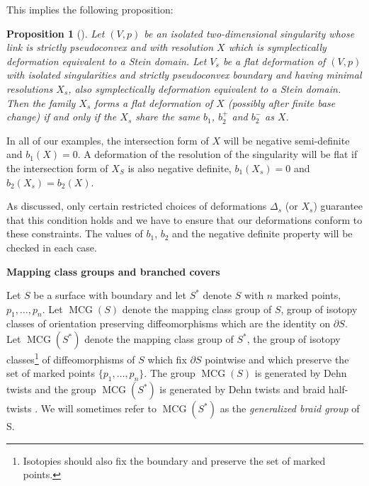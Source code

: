\documentclass[11pt,letterpaper,reqno]{amsart}
\newtheorem{proposition}[theorem]{Proposition}
\theoremstyle{remark}
\DeclareMathOperator{\MCG}{MCG}
\begin{document}
This implies the following proposition:

\begin{proposition}[\cite{SV}] \label{prop:SV} Let $(V,p)$ be an isolated two-dimensional singularity whose link is strictly pseudoconvex and with resolution $X$ which is symplectically deformation equivalent to a Stein domain. Let $V_s$ be a flat deformation of $(V,p)$ with isolated singularities and strictly pseudoconvex boundary and having minimal resolutions $X_s$, also symplectically deformation equivalent to a Stein domain. Then the family $X_s$ forms a flat deformation of $X$ (possibly after finite base change) if and only if the $X_s$ share the same $b_1$, $b_2^+$ and $b_2^-$ as $X$. 
\label{prop:Laufer}
\end{proposition}

In all of our examples, the intersection form of $X$ will be negative semi-definite and $b_1(X)=0$. A deformation of the resolution of the singularity will be flat if the intersection form of $X_S$ is also negative definite, $b_1(X_s) = 0$ and $b_2(X_s) = b_2(X)$. 

As discussed, only certain restricted choices of deformations $\Delta_s$ (or $X_s$) guarantee that this condition holds and we have to ensure that our deformations conform to these constraints. The values of $b_1$, $b_2$ and the negative definite property will be checked in each case.





{\bf{Mapping class groups and branched covers}} 

Let $S$ be a surface with boundary and let $S^*$ denote $S$ with $n$ marked points, $p_1, \dots, p_n$. Let $\MCG(S)$ denote the mapping class group of $S$, group of isotopy classes of orientation preserving diffeomorphisms which are the identity on $\partial S$. Let $\MCG(S^*)$ denote the mapping class group of $S^*$, the group of isotopy classes\footnote{Isotopies should also fix the boundary and preserve the set of marked points.} of diffeomorphisms of $S$ which fix $\partial S$ pointwise and which preserve the set of marked points $\{p_1, \dots, p_n\}$. The group $\MCG(S)$ is generated by Dehn twists \cite{Lickorish} and the group $\MCG(S^*)$ is generated by Dehn twists and braid half-twists \cite{Lickorish, FarbMargalit}. We will sometimes refer to $\MCG(S^*)$ as the \emph{generalized braid group} of S.
\end{document}
